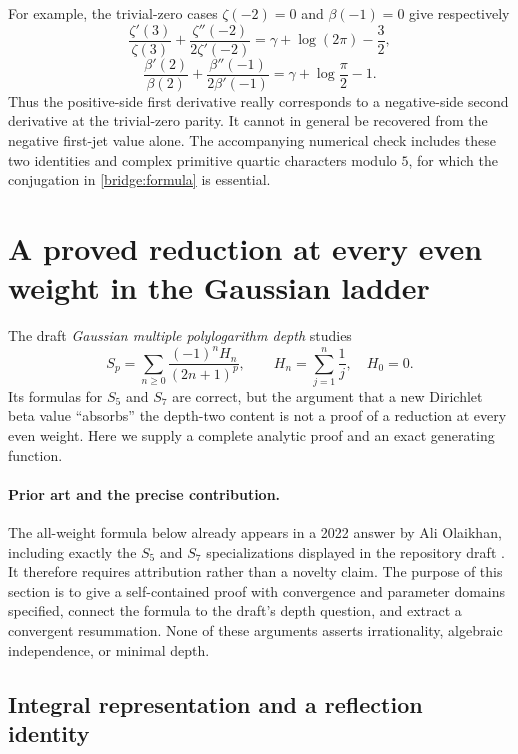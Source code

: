 \documentclass[11pt,a4paper]{article}
\theoremstyle{definition}
\theoremstyle{remark}
\numberwithin{equation}{section}
\begin{document}
For example, the trivial-zero cases $\zeta(-2)=0$ and $\beta(-1)=0$
give respectively
\[
 \frac{\zeta'(3)}{\zeta(3)}
 +\frac{\zeta''(-2)}{2\zeta'(-2)}
 =\gamma+\log(2\pi)-\frac32,
\]
\[
 \frac{\beta'(2)}{\beta(2)}
 +\frac{\beta''(-1)}{2\beta'(-1)}
 =\gamma+\log\frac\pi2-1.
\]
Thus the positive-side first derivative really corresponds to a
negative-side second derivative at the trivial-zero parity.  It cannot
in general be recovered from the negative first-jet value alone.
The accompanying numerical check includes these two identities and
complex primitive quartic characters modulo $5$, for which the
conjugation in \eqref{bridge:formula} is essential.

\section{A proved reduction at every even weight in the Gaussian ladder}
\label{gau:section}

The draft \emph{Gaussian multiple polylogarithm depth} studies
\begin{equation}\label{gau:sum-definition}
 S_p=\sum_{n\geq 0}\frac{(-1)^nH_n}{(2n+1)^p},
 \qquad H_n=\sum_{j=1}^n\frac1j,\quad H_0=0.
\end{equation}
Its formulas for $S_5$ and $S_7$ are correct, but the argument that a new
Dirichlet beta value ``absorbs'' the depth-two content is not a proof of a
reduction at every even weight. Here we supply a complete analytic proof and
an exact generating function.

\paragraph{Prior art and the precise contribution.}
The all-weight formula below already appears in a 2022 answer by
Ali Olaikhan, including exactly the $S_5$ and $S_7$ specializations displayed
in the repository draft \cite{gau-olaikhan-2022}.
It therefore requires attribution rather than a novelty claim. The purpose
of this section is to give a self-contained proof with convergence and
parameter domains specified, connect the formula to the draft's depth
question, and extract a convergent resummation. None of these arguments
asserts irrationality, algebraic independence, or minimal depth.

\subsection{Integral representation and a reflection identity}
\end{document}
